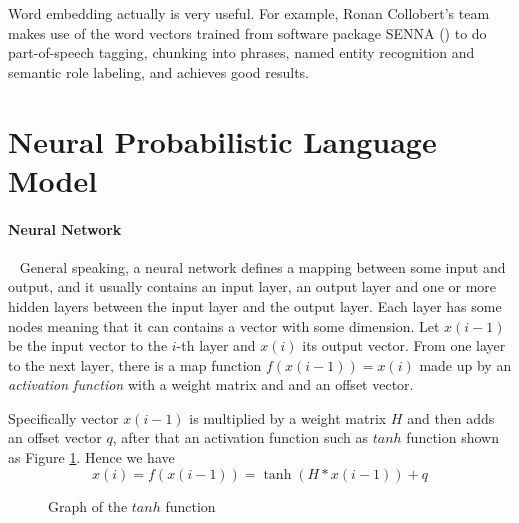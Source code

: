 Word embedding actually is very useful. For example, Ronan Collobert's team makes use of the word vectors trained from software package SENNA (\citep{CollobertWestonEtAl2011}) to do part-of-speech tagging, chunking into phrases, named entity recognition and semantic role labeling, and achieves good results. 


\section{Neural Probabilistic Language Model}


\paragraph{Neural Network}\ 
General speaking, a neural network defines a mapping between some input and output, and it usually contains an input layer, an output layer and one or more hidden layers between the input layer and the output layer. Each layer has some nodes meaning that it can contains a vector with some dimension. Let $x(i-1)$ be the input vector to the $i$-th layer and $x(i)$ its output vector.
From one layer to the next layer, there is a map function $f(x(i-1))=x(i)$ made up by an \emph{activation function} with a weight matrix and and an offset vector. 

Specifically  vector $x(i-1)$ is  multiplied by a weight matrix $H$ and then adds an offset vector $q$, after that an activation function such as $tanh$ function shown as Figure \ref{fig:tanh}. Hence we have 
\begin{equation}
x(i) = f(x(i-1)) = \tanh(H * x(i-1)) + q
\end{equation}

\begin{figure}[tb]
  \centering
	\caption{Graph of the $tanh$ function}
	\label{fig:tanh}
\end{figure}


